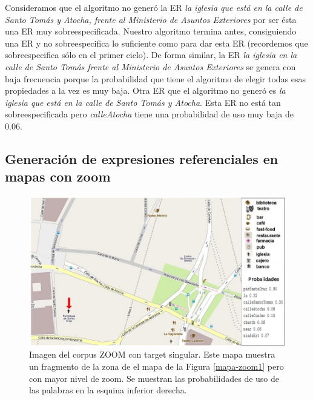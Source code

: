 
Consideramos que el algoritmo no gener\'o la ER {\it la iglesia que est\'a en la calle de Santo Tom\'as y Atocha, frente al Ministerio de Asuntos Exteriores} por ser \'esta una ER muy sobreespecificada. Nuestro algoritmo termina antes, consiguiendo una ER y no sobreespecifica lo suficiente como para dar esta ER (recordemos que sobreespecifica s\'olo en el primer ciclo). De forma similar, la ER {\it la iglesia en la calle de Santo Tom\'as frente al Ministerio de Asuntos Exteriores} se genera con baja frecuencia porque la probabilidad que tiene el algoritmo de elegir todas esas propiedades a la vez es muy baja.  Otra ER que el algoritmo no gener\'o es {\it la iglesia que est\'a en la calle de Santo Tom\'as y Atocha}. Esta ER no est\'a tan sobreespecificada pero {\it calleAtocha} tiene una probabilidad de uso muy baja de 0.06.

\subsection{Generaci\'on de expresiones referenciales en mapas con zoom}
\label{sec:conzoom}

\begin{figure}[H]
\centering
\includegraphics[width=\textwidth]{images/corpus/mapa16-prob.png}
\caption{Imagen del corpus ZOOM con target singular. Este mapa muestra un fragmento de la zona de el mapa de la Figura \ref{mapa-zoom1} pero con mayor nivel de zoom. Se muestran las probabilidades de uso de las palabras en la esquina inferior derecha.}
\label{mapa-zoom2x}
\end{figure}

